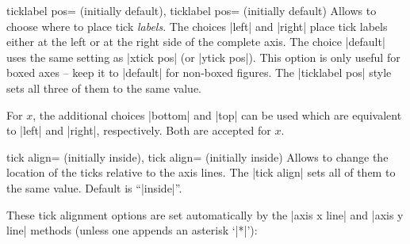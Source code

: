 \begin{pgfplotsxykeylist}{%
    \x ticklabel pos= (initially default),
       ticklabel pos= (initially default)%
}
    Allows to choose where to place tick \emph{labels}. The choices |left| and
    |right| place tick labels either at the left or at the right side of the
    complete axis. The choice |default| uses the same setting as |xtick pos|
    (or |ytick pos|). This option is only useful for boxed axes -- keep it to
    |default| for non-boxed figures. The |ticklabel pos| style sets all three
    of them to the same value.

    For $x$, the additional choices |bottom| and |top| can be used which are
    equivalent to |left| and |right|, respectively. Both are accepted for $x$.
\end{pgfplotsxykeylist}

\begin{pgfplotsxykeylist}{%
    \x tick align= (initially inside),
       tick align= (initially inside)%
}
    Allows to change the location of the ticks relative to the axis lines. The
    |tick align| sets all of them to the same value. Default is ``|inside|''.
\begin{codeexample}[]
\end{codeexample}

\begin{codeexample}[]
\end{codeexample}

    These tick alignment options are set automatically by the |axis x line| and
    |axis y line| methods (unless one appends an asterisk `|*|'):
\begin{codeexample}[]
\end{codeexample}
\end{pgfplotsxykeylist}

